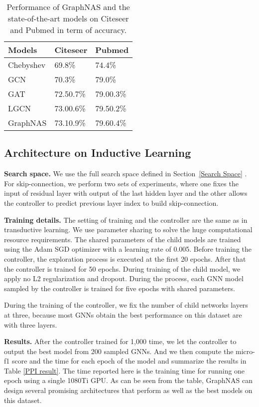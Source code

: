 \documentclass{article}
\begin{document}
\begin{table}[]
	\caption{Performance of GraphNAS and the state-of-the-art models on Citeseer and Pubmed in term of accuracy.}
	\label{other_citation}
	\begin{tabular}{l|l|l}
		\hline
		Models    &    Citeseer     & Pubmed       \\ \hline
		Chebyshev &        69.8\%       & 74.4\%       \\
		GCN       &  70.3\%       & 79.0\%       \\
		GAT       &     72.50.7\%         &      79.00.3\%        \\
		LGCN      & 73.00.6\% & 79.50.2\% \\ \hline
		GraphNAS  &      73.10.9\%     & 79.60.4\%      \\ \hline
	\end{tabular}
\end{table}

\subsection{Architecture on Inductive Learning}

\textbf{Search space.} 
We use the full search space defined in Section~\ref{Search Space} . For skip-connection, we perform two sets of experiments, where one fixes the input of residual layer with output of the last hidden layer and the other allows the controller to predict previous layer index to build skip-connection.


\textbf{Training details.}
The setting of training  and the controller  are the same as  in transductive learning.
We use parameter sharing to solve the huge computational resource requirements.
The shared parameters of the child models are trained using the Adam SGD  optimizer with a learning rate of 0.005. 
Before training the controller, the exploration process is executed at the first 20 epochs. After that the controller is trained for 50 epochs.
During training of the child model, we apply no L2 regularization and dropout. During the  process,   each GNN  model  sampled by the controller is trained for five epochs with shared parameters. 

During the training of the controller, we fix the number of child networks layers at three, because most  GNNs obtain the best performance on this dataset are with three layers.



\textbf{Results.}
After the controller trained for 1,000 time, we let the controller to output the best model from 200 sampled GNNs. And we then compute the  micro-f1 score and the time for each epoch of the model and summarize the results in Table \ref{PPI result}. The time reported here is the training time for running one epoch using a single 1080Ti GPU. As can be seen from the table, GraphNAS can design several promising architectures that perform as well as the best models on this dataset.
\end{document}
